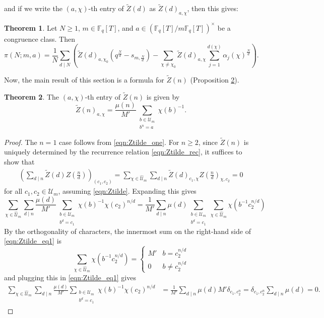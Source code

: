 \documentclass[10pt,reqno]{amsproc}
\newcommand{\what}[1]{\widehat{#1}}
\newcommand{\bF}{\mathbb{F}}
\newcommand{\scU}{\mathscr{U}}
\newcommand{\1}{\mathds{1}}	%
\theoremstyle{definition}
\newtheorem{theorem}{Theorem}[section]
\theoremstyle{remark}
\begin{document}
and if we write the \((a, \chi)\)-th entry of \(\widetilde{Z}(d)\) as \(\widetilde{Z}(d)_{a, \chi}\), then this gives:
\begin{theorem}
    \label{thm:picformula}
    Let $N \ge 1$, $m \in \bF_q[T]$, and $a \in (\bF_q[T] / m \bF_q[T])^\times$ be a congruence class.
    Then
    \begin{equation}
    \label{eqn:picformula1}
        \pi(N; m, a) = \frac{1}{N} \sum_{d \mid N} \left(\widetilde{Z}(d)_{a, \chi_0} (q^{\frac{N}{d}} - s_{m, \frac{N}{d}}) - \sum_{\chi \ne \chi_0} \widetilde{Z}(d)_{a, \chi}\sum_{j=1}^{d(\chi)} \alpha_j(\chi)^{\frac{N}{d}} \right).
    \end{equation}
\end{theorem}
Now, the main result of this section is a formula for \(\widetilde{Z}(n)\) (Proposition \ref{thm:Ztilde}).
\begin{theorem}
    \label{thm:Ztilde}
    The $(a, \chi)$-th entry of $\widetilde{Z}(n)$ is given by
    \begin{equation}
    \label{eqn:Ztilde}
        \widetilde{Z}(n)_{a, \chi} = \frac{\mu(n)}{M'} \sum_{\substack{b \in \scU_m \\ b^n = a}} \chi(b)^{-1}.
    \end{equation}
\end{theorem}
\begin{proof}
The $n = 1$ case follows from \eqref{eqn:Ztilde_one}.
For $n \ge 2$, since $\widetilde{Z}(n)$ is uniquely determined by the recurrence relation \eqref{eqn:Ztilde_rec}, it suffices to show that
\begin{align*}
    \left(\sum_{d \mid n} \widetilde{Z}(d) Z\left(\frac{n}{d}\right)\right)_{(c_1, c_2)} = \sum_{\chi \in \what{\scU}_m}\sum_{d \mid n} \widetilde{Z}(d)_{c_1, \chi} Z\left(\frac{n}{d}\right)_{\chi, c_2} = 0
\end{align*}
for all $c_1, c_2 \in \scU_m$, assuming \eqref{eqn:Ztilde}.
Expanding this gives
\begin{equation}
\label{eqn:Ztilde_eq1}
    \sum_{\chi \in \what{\scU}_m} \sum_{d \mid n} \frac{\mu(d)}{M'} \sum_{\substack{b \in \scU_m \\ b^d = c_1}} \chi(b)^{-1} \chi(c_2)^{n/d} = \frac{1}{M'} \sum_{d \mid n} \mu(d) \sum_{\substack{b \in \scU_m \\ b^d = c_1}} \sum_{\chi \in \what{\scU}_m} \chi(b^{-1} c_2^{n/d})
\end{equation}
By the orthogonality of characters, the innermost sum on the right-hand side of \eqref{eqn:Ztilde_eq1} is
\[
\sum_{\chi \in \what{\scU}_m} \chi(b^{-1} c_2^{n/d}) = \begin{cases}
    M' & b = c_2^{n/d} \\ 0 & b \ne c_2^{n/d}
\end{cases}
\]
and plugging this in \eqref{eqn:Ztilde_eq1} gives
\begin{align*}
    \sum_{\chi \in \what{\scU}_m} \sum_{d \mid n} \frac{\mu(d)}{M'} \sum_{\substack{b \in \scU_m \\ b^d = c_1}} \chi(b)^{-1} \chi(c_2)^{n/d} &= \frac{1}{M'} \sum_{d \mid n} \mu(d) M' \delta_{c_1, c_2^n}  = \delta_{c_1, c_2^n} \sum_{d \mid n} \mu(d) = 0.
\end{align*}
\end{proof}
\end{document}
